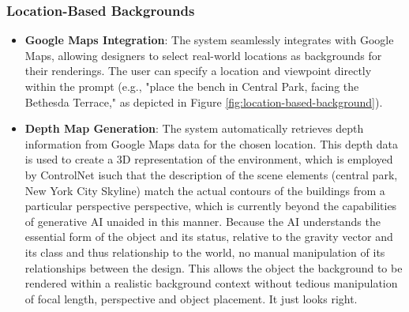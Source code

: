 \documentclass[12pt]{report}
\begin{document}
\subsubsection{Location-Based Backgrounds}
\begin{itemize}
\item \textbf{Google Maps Integration}: The system seamlessly integrates with Google Maps, allowing designers to select real-world locations as backgrounds for their renderings. The user can specify a location and viewpoint directly within the prompt (e.g., "place the bench in Central Park, facing the Bethesda Terrace," as depicted in Figure \ref{fig:location-based-background}).

\item \textbf{Depth Map Generation}: The system automatically retrieves depth information from Google Maps data for the chosen location. This depth data is used to create a 3D representation of the environment, which is employed by ControlNet isuch that the description of the scene elements (central park, New York City Skyline) match the actual contours of the buildings from a particular perspective  perspective, which is currently beyond the capabilities of generative AI unaided in this manner. Because the AI understands the essential form of the object and its status, relative to the gravity vector and its class and thus relationship to the world, no manual manipulation of its  relationships between the design. This allows the object the background to be rendered within a realistic background context without tedious manipulation of focal length, perspective and object placement. It just looks right.
\end{itemize}

\end{document}
